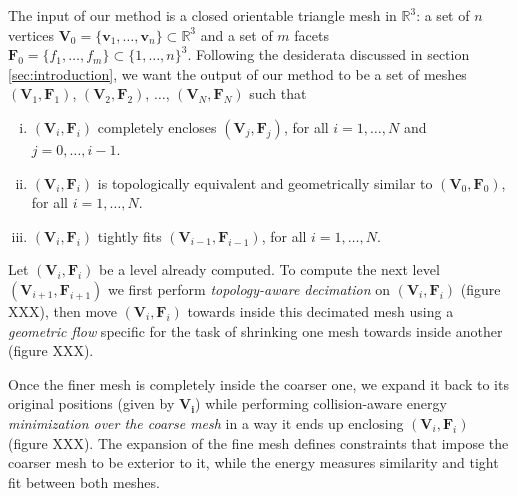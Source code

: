 \documentclass{acmtog}
\begin{document}
The input of our method is a closed orientable triangle mesh in $\mathbb{R}^3$:
a set of $n$ vertices $\mathbf{V}_0= \{ \mathbf{v}_1, \ldots, \mathbf{v}_n \} \subset \mathbb{R}^3$
and a set of $m$ facets $\mathbf{F}_0 = \{ f_1, \ldots, f_m \} \subset \{ 1, \ldots, n \}^3$. 
Following the desiderata discussed in section \ref{sec:introduction}, we want the output of our method to be a set of meshes $(\mathbf{V}_1,\mathbf{F}_1)$,  $(\mathbf{V}_2,\mathbf{F}_2)$, $\ldots$, $(\mathbf{V}_N,\mathbf{F}_N)$
such that 

\begin{enumerate}[(i)]
\item $(\mathbf{V}_{i},\mathbf{F}_{i})$ completely encloses $(\mathbf{V}_j,\mathbf{F}_j)$, for all $i = 1, \ldots, N$ and $j = 0, \ldots, i-1$.
\item $(\mathbf{V}_{i},\mathbf{F}_{i})$ is topologically equivalent and geometrically similar to $(\mathbf{V}_{0},\mathbf{F}_{0})$, for all $i = 1, \ldots, N$.
\item $(\mathbf{V}_{i},\mathbf{F}_{i})$ tightly fits $(\mathbf{V}_{i-1},\mathbf{F}_{i-1})$, for all $i = 1, \ldots, N$.
\end{enumerate}

Let $(\mathbf{V}_i,\mathbf{F}_i)$ be a level already computed. To compute the next level $(\mathbf{V}_{i+1},\mathbf{F}_{i+1})$ we first perform \emph{topology-aware decimation} on $(\mathbf{V}_i,\mathbf{F}_i)$ (figure XXX), then move $(\mathbf{V}_i,\mathbf{F}_i)$ towards inside this decimated mesh using a \emph{geometric flow} specific for the task of shrinking one mesh towards inside another (figure XXX). 

Once the finer mesh is completely inside the coarser one, we expand it back to its original positions (given by $\mathbf{V_i}$) while performing collision-aware energy \emph{minimization over the coarse mesh} in a way it ends up enclosing $(\mathbf{V}_i,\mathbf{F}_i)$ (figure XXX). The expansion of the fine mesh defines constraints that impose the coarser mesh to be exterior to it, while the energy measures similarity and tight fit between both meshes.
\end{document}
